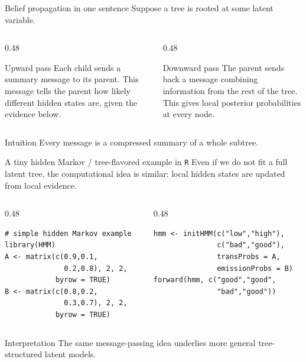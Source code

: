 \documentclass[dvipsnames,aspectratio=169,handout]{beamer}
\begin{document}
\begin{frame}{Belief propagation in one sentence}
Suppose a tree is rooted at some latent variable.

\begin{columns}[T]
\begin{column}{0.48\textwidth}
\begin{block}{Upward pass}
Each child sends a summary message to its parent.
This message tells the parent how likely different hidden states are, given the evidence below.
\end{block}
\end{column}
\begin{column}{0.48\textwidth}
\begin{block}{Downward pass}
The parent sends back a message combining information from the rest of the tree.
This gives local posterior probabilities at every node.
\end{block}
\end{column}
\end{columns}

\begin{alertblock}{Intuition}
Every message is a compressed summary of a whole subtree.
\end{alertblock}
\end{frame}

\begin{frame}[fragile]{A tiny hidden Markov / tree-flavored example in \texttt{R}}
Even if we do not fit a full latent tree, the computational idea is similar: local hidden states are updated from local evidence.

\begin{columns}[T,onlytextwidth]
\begin{column}{0.48\textwidth}
\begin{lstlisting}
# simple hidden Markov example
library(HMM)
A <- matrix(c(0.9,0.1,
              0.2,0.8), 2, 2,
            byrow = TRUE)
B <- matrix(c(0.8,0.2,
              0.3,0.7), 2, 2,
            byrow = TRUE)
\end{lstlisting}
\end{column}
\begin{column}{0.48\textwidth}
\begin{lstlisting}
hmm <- initHMM(c("low","high"),
               c("bad","good"),
               transProbs = A,
               emissionProbs = B)
forward(hmm, c("good","good",
               "bad","good"))
\end{lstlisting}
\end{column}
\end{columns}

\begin{alertblock}{Interpretation}
The same message-passing idea underlies more general tree-structured latent models.
\end{alertblock}
\end{frame}
\end{document}
